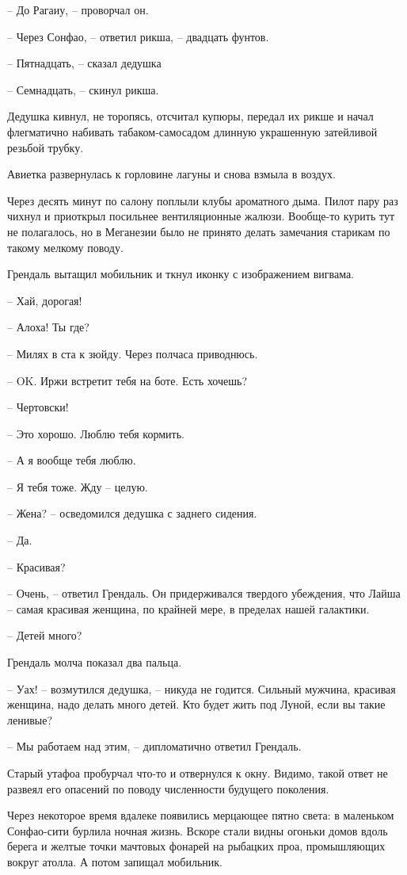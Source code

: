 -- До Рагаиу, -- проворчал он.

-- Через Сонфао, -- ответил рикша, -- двадцать фунтов.

-- Пятнадцать, -- сказал дедушка

-- Семнадцать, -- скинул рикша.

Дедушка кивнул, не торопясь, отсчитал купюры, передал их рикше и начал флегматично набивать табаком-самосадом длинную украшенную затейливой резьбой трубку.

Авиетка развернулась к горловине лагуны и снова взмыла в воздух.

Через десять минут по салону поплыли клубы ароматного дыма. Пилот пару раз чихнул и приоткрыл посильнее вентиляционные жалюзи. Вообще-то курить тут не полагалось, но в Меганезии было не принято делать замечания старикам по такому мелкому поводу.

Грендаль вытащил мобильник и ткнул иконку с изображением вигвама.

-- Хай, дорогая!

-- Алоха! Ты где?

-- Милях в ста к зюйду. Через полчаса приводнюсь.

-- OK. Иржи встретит тебя на боте. Есть хочешь?

-- Чертовски!

-- Это хорошо. Люблю тебя кормить.

-- А я вообще тебя люблю.

-- Я тебя тоже. Жду -- целую.

-- Жена? -- осведомился дедушка с заднего сидения.

-- Да.

-- Красивая?

-- Очень, -- ответил Грендаль. Он придерживался твердого убеждения, что Лайша -- самая красивая женщина, по крайней мере, в пределах нашей галактики.

-- Детей много?

Грендаль молча показал два пальца.

-- Уах! -- возмутился дедушка, -- никуда не годится. Сильный мужчина, красивая женщина, надо делать много детей. Кто будет жить под Луной, если вы такие ленивые?

-- Мы работаем над этим, -- дипломатично ответил Грендаль.

Старый утафоа пробурчал что-то и отвернулся к окну. Видимо, такой ответ не развеял его опасений по поводу численности будущего поколения.

Через некоторое время вдалеке появились мерцающее пятно света: в маленьком Сонфао-сити бурлила ночная жизнь. Вскоре стали видны огоньки домов вдоль берега и желтые точки мачтовых фонарей на рыбацких проа, промышляющих вокруг атолла. А потом запищал мобильник.

